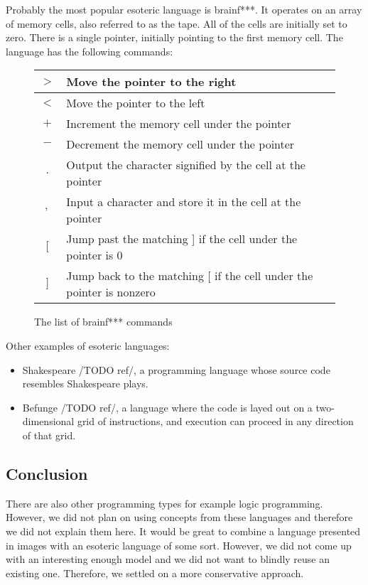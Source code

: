 Probably the most popular esoteric language is brainf***. It operates on an array of memory cells, also referred to as the tape. All of the cells are initially
set to zero. There is a single pointer, initially pointing to the first memory cell. The language has the following commands:

\begin{figure}[!hbt]
    \centering
    \begin{tabular}{|c l |} 
    \hline
    $>$ & Move the pointer to the right \\
    \hline
    $<$ & Move the pointer to the left \\
    \hline
    $+$ & Increment the memory cell under the pointer \\
    \hline
    $-$ & Decrement the memory cell under the pointer \\
    \hline
    $.$ & Output the character signified by the cell at the pointer \\
    \hline
    $,$ & Input a character and store it in the cell at the pointer \\
    \hline
    $[$ & Jump past the matching ] if the cell under the pointer is 0 \\
    \hline
    $]$ & Jump back to the matching [ if the cell under the pointer is nonzero \\
    \hline
    \end{tabular}
    \caption{The list of brainf*** commands}
\end{figure}

Other examples of esoteric languages:
\begin{itemize}
    \item Shakespeare /TODO ref/, a programming language whose source code resembles Shakespeare plays. 
    \item Befunge /TODO ref/, a language where the code is layed out on a two-dimensional grid of instructions, and execution can proceed in any direction of that grid.
\end{itemize}

\subsection{Conclusion}
There are also other programming types for example logic programming. However, we did not plan on using concepts from these languages and therefore we did
not explain them here. It would be great to combine a language presented in images with an esoteric language of some sort. However, we did not
come up with an interesting enough model and we did not want to blindly reuse an existing one. Therefore, we settled on a more conservative approach.

